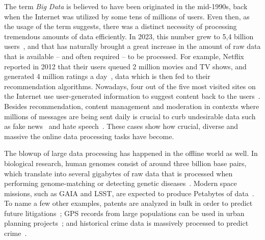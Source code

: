 %
%
%
%
%
%
%
%

The term {\it Big Data} is believed to have been originated in the mid-1990s, back when the Internet was utilized by some tens of millions of users. Even then, as the usage of the term suggests, there was a distinct necessity of processing tremendous amounts of data efficiently. In 2023, this number grew to 5,4 billion users~\cite{netuse}, and that has naturally brought a great increase in the amount of raw data that is available -- and often required -- to be processed.
For example, Netflix reported in 2012 that their users queued 2 million movies and TV shows, and generated 4 million ratings a day~\cite{netflixsize}, data which is then fed to their recommendation algorithms. Nowadays, four out of the five most visited sites on the Internet use user-generated information to suggest content back to the users~\cite{topwebsites}. 
Besides recommendation, content management and moderation in contexts where millions of messages are being sent daily is crucial to curb undesirable data such as fake news~\cite{fakenews} and hate speech~\cite{hatespeech}.
These cases show how crucial, diverse and massive the online data processing tasks have become.

The blowup of large data processing has happened in the offline world as well. In biological research, human genomes consist of around three billion base pairs, which translate into several gigabytes of raw data that is processed when performing genome-matching or detecting genetic diseases~\cite{genomes}. Modern space missions, such as GAIA and LSST, are expected to produce Petabytes of data~\cite{space}. To name a few other examples, patents are analyzed in bulk in order to predict future litigations~\cite{patents}; GPS records from large populations can be used in urban planning projects~\cite{urban}; and historical crime data is massively processed to predict crime~\cite{crime}.

